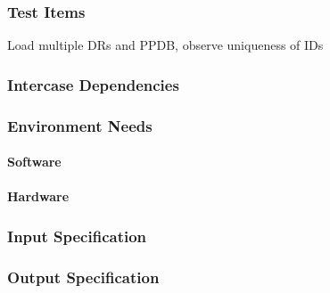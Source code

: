 \subsubsection{Test Items}
Load multiple DRs and PPDB, observe uniqueness of IDs



\subsubsection{Intercase Dependencies}

\subsubsection{Environment Needs}

\paragraph{Software}

\paragraph{Hardware}

\subsubsection{Input Specification}

\subsubsection{Output Specification}

